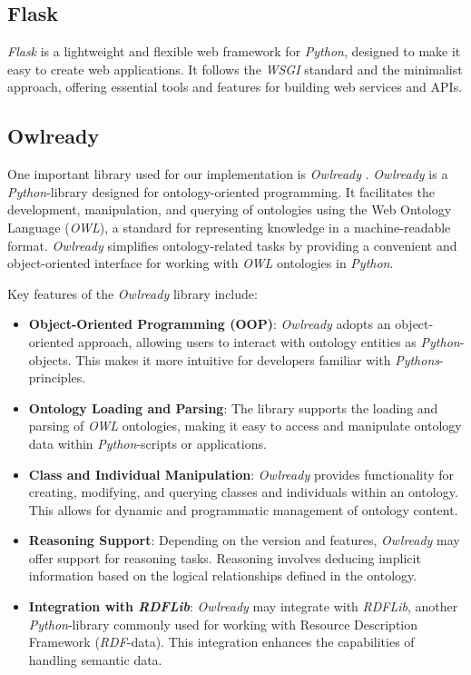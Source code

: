 \subsection{Flask}
\label{sec:flask}
\textit{Flask} \cite{grinberg2018flask} is a lightweight and flexible web framework for \textit{Python}, designed to make it easy to create web applications. It follows the \textit{WSGI} standard and the minimalist approach, offering essential tools and features for building web services and APIs. 

\subsection{Owlready}
\label{sec:OWLReady}
One important library used for our implementation is \textit{Owlready} \cite{LAMY201711}. \textit{Owlready} \cite{LAMY201711} is a \textit{Python}-library designed for ontology-oriented programming. It facilitates the development, manipulation, and querying of ontologies using the Web Ontology Language (\textit{OWL}), a standard for representing knowledge in a machine-readable format. \textit{Owlready} \cite{LAMY201711} simplifies ontology-related tasks by providing a convenient and object-oriented interface for working with \textit{OWL} ontologies in \textit{Python}.

Key features of the \textit{Owlready} \cite{LAMY201711} library include:

\begin{itemize}
	\item \textbf{Object-Oriented Programming (OOP)}: \textit{Owlready} \cite{LAMY201711} adopts an object-oriented approach, allowing users to interact with ontology entities as \textit{Python}-objects. This makes it more intuitive for developers familiar with \textit{Pythons}-principles.
	\item \textbf{Ontology Loading and Parsing}: The library supports the loading and parsing of \textit{OWL} ontologies, making it easy to access and manipulate ontology data within \textit{Python}-scripts or applications.
	\item \textbf{Class and Individual Manipulation}: \textit{Owlready} \cite{LAMY201711} provides functionality for creating, modifying, and querying classes and individuals within an ontology. This allows for dynamic and programmatic management of ontology content.
	\item \textbf{Reasoning Support}: Depending on the version and features, \textit{Owlready} \cite{LAMY201711} may offer support for reasoning tasks. Reasoning involves deducing implicit information based on the logical relationships defined in the ontology.
	\item \textbf{Integration with \textit{RDFLib}}: \textit{Owlready} \cite{LAMY201711} may integrate with \textit{RDFLib}, another \textit{Python}-library commonly used for working with Resource Description Framework (\textit{RDF}-data). This integration enhances the capabilities of handling semantic data.
\end{itemize}

